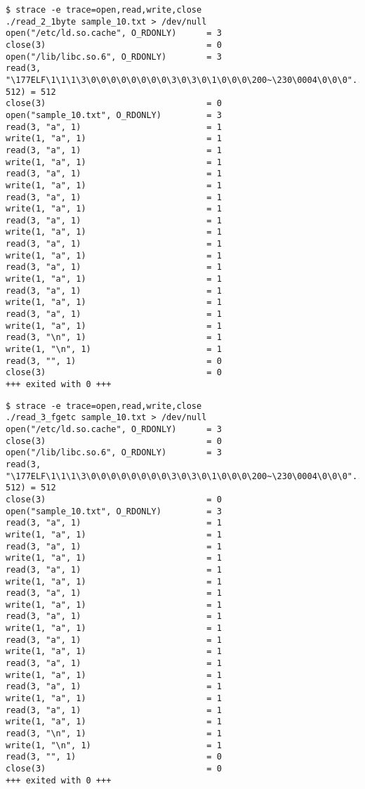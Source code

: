 \documentclass[a4paper,12pt]{jsarticle}
\begin{document}
\begin{lstlisting}[basicstyle=\footnotesize,caption={strace\_read\_2\_1byte}, label=strace1byte]
$ strace -e trace=open,read,write,close 
./read_2_1byte sample_10.txt > /dev/null 
open("/etc/ld.so.cache", O_RDONLY)      = 3
close(3)                                = 0
open("/lib/libc.so.6", O_RDONLY)        = 3
read(3, "\177ELF\1\1\1\3\0\0\0\0\0\0\0\0\3\0\3\0\1\0\0\0\200~\230\0004\0\0\0"..., 512) = 512
close(3)                                = 0
open("sample_10.txt", O_RDONLY)         = 3
read(3, "a", 1)                         = 1
write(1, "a", 1)                        = 1
read(3, "a", 1)                         = 1
write(1, "a", 1)                        = 1
read(3, "a", 1)                         = 1
write(1, "a", 1)                        = 1
read(3, "a", 1)                         = 1
write(1, "a", 1)                        = 1
read(3, "a", 1)                         = 1
write(1, "a", 1)                        = 1
read(3, "a", 1)                         = 1
write(1, "a", 1)                        = 1
read(3, "a", 1)                         = 1
write(1, "a", 1)                        = 1
read(3, "a", 1)                         = 1
write(1, "a", 1)                        = 1
read(3, "a", 1)                         = 1
write(1, "a", 1)                        = 1
read(3, "\n", 1)                        = 1
write(1, "\n", 1)                       = 1
read(3, "", 1)                          = 0
close(3)                                = 0
+++ exited with 0 +++

	\end{lstlisting}

\begin{lstlisting}[basicstyle=\footnotesize, caption={strace\_read\_3\_fgetc}, label=stracefgetc]
$ strace -e trace=open,read,write,close 
./read_3_fgetc sample_10.txt > /dev/null 
open("/etc/ld.so.cache", O_RDONLY)      = 3
close(3)                                = 0
open("/lib/libc.so.6", O_RDONLY)        = 3
read(3, "\177ELF\1\1\1\3\0\0\0\0\0\0\0\0\3\0\3\0\1\0\0\0\200~\230\0004\0\0\0"..., 512) = 512
close(3)                                = 0
open("sample_10.txt", O_RDONLY)         = 3
read(3, "a", 1)                         = 1
write(1, "a", 1)                        = 1
read(3, "a", 1)                         = 1
write(1, "a", 1)                        = 1
read(3, "a", 1)                         = 1
write(1, "a", 1)                        = 1
read(3, "a", 1)                         = 1
write(1, "a", 1)                        = 1
read(3, "a", 1)                         = 1
write(1, "a", 1)                        = 1
read(3, "a", 1)                         = 1
write(1, "a", 1)                        = 1
read(3, "a", 1)                         = 1
write(1, "a", 1)                        = 1
read(3, "a", 1)                         = 1
write(1, "a", 1)                        = 1
read(3, "a", 1)                         = 1
write(1, "a", 1)                        = 1
read(3, "\n", 1)                        = 1
write(1, "\n", 1)                       = 1
read(3, "", 1)                          = 0
close(3)                                = 0
+++ exited with 0 +++
        \end{lstlisting}
\end{document}
